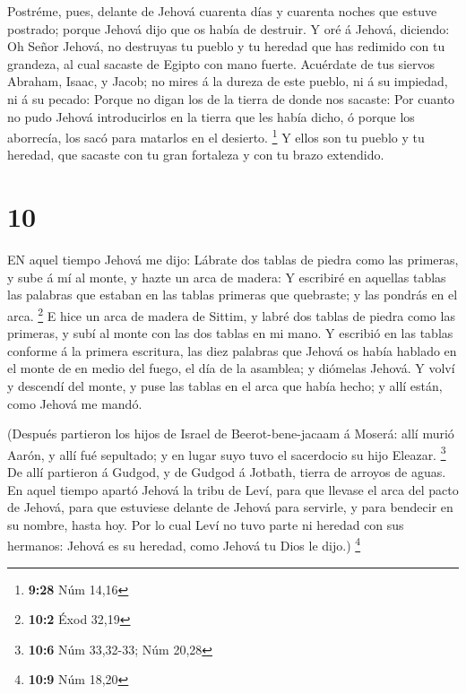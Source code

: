 Postréme, pues, delante de Jehová cuarenta días y cuarenta
noches que estuve postrado; porque Jehová dijo que os había de destruir.
 Y oré á Jehová, diciendo: Oh Señor Jehová, no destruyas tu
pueblo y tu heredad que has redimido con tu grandeza, al cual sacaste de
Egipto con mano fuerte.  Acuérdate de tus siervos Abraham,
Isaac, y Jacob; no mires á la dureza de este pueblo, ni á su impiedad,
ni á su pecado:  Porque no digan los de la tierra de donde
nos sacaste: Por cuanto no pudo Jehová introducirlos en la tierra que
les había dicho, ó porque los aborrecía, los sacó para matarlos en el
desierto. \footnote{\textbf{9:28} Núm 14,16}  Y ellos son
tu pueblo y tu heredad, que sacaste con tu gran fortaleza y con tu brazo
extendido.

\hypertarget{section-9}{%
\section{10}\label{section-9}}

 EN aquel tiempo Jehová me dijo: Lábrate dos tablas de
piedra como las primeras, y sube á mí al monte, y hazte un arca de
madera:  Y escribiré en aquellas tablas las palabras que
estaban en las tablas primeras que quebraste; y las pondrás en el arca.
\footnote{\textbf{10:2} Éxod 32,19}  E hice un arca de
madera de Sittim, y labré dos tablas de piedra como las primeras, y subí
al monte con las dos tablas en mi mano.  Y escribió en las
tablas conforme á la primera escritura, las diez palabras que Jehová os
había hablado en el monte de en medio del fuego, el día de la asamblea;
y diómelas Jehová.  Y volví y descendí del monte, y puse las
tablas en el arca que había hecho; y allí están, como Jehová me mandó.

 (Después partieron los hijos de Israel de
Beerot-bene-jacaam á Moserá: allí murió Aarón, y allí fué sepultado; y
en lugar suyo tuvo el sacerdocio su hijo Eleazar. \footnote{\textbf{10:6}
  Núm 33,32-33; Núm 20,28}  De allí partieron á Gudgod, y de
Gudgod á Jotbath, tierra de arroyos de aguas.  En aquel
tiempo apartó Jehová la tribu de Leví, para que llevase el arca del
pacto de Jehová, para que estuviese delante de Jehová para servirle, y
para bendecir en su nombre, hasta hoy.  Por lo cual Leví no
tuvo parte ni heredad con sus hermanos: Jehová es su heredad, como
Jehová tu Dios le dijo.) \footnote{\textbf{10:9} Núm 18,20}

